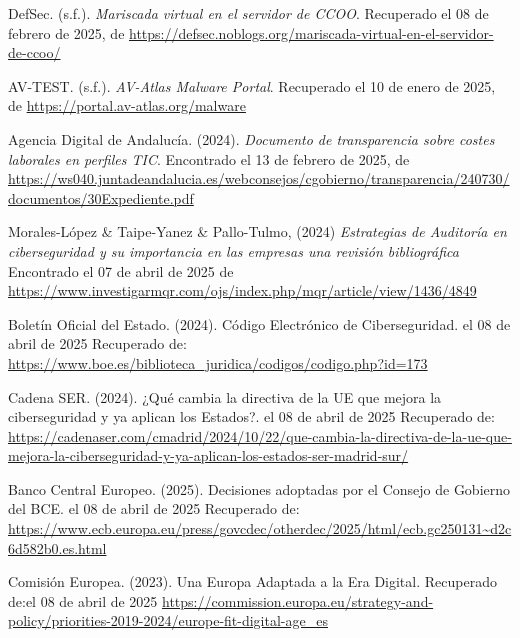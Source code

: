 \documentclass[a4paper, 10pt]{article}
\begin{document}
\begin{thebibliography}{20}
    
    DefSec. (s.f.). \textit{Mariscada virtual en el servidor de CCOO}. Recuperado el 08 de febrero de 2025, de \url{https://defsec.noblogs.org/mariscada-virtual-en-el-servidor-de-ccoo/}
    
    AV-TEST. (s.f.). \textit{AV-Atlas Malware Portal}. Recuperado el 10 de enero de 2025, de \url{https://portal.av-atlas.org/malware}
    
    Agencia Digital de Andalucía. (2024). \textit{Documento de transparencia sobre costes laborales en perfiles TIC}. Encontrado el 13 de febrero de 2025, de \url{https://ws040.juntadeandalucia.es/webconsejos/cgobierno/transparencia/240730/documentos/30Expediente.pdf}
    
    Morales-López \& Taipe-Yanez \& Pallo-Tulmo, (2024) \textit{Estrategias de Auditoría en ciberseguridad y su importancia en las empresas una revisión bibliográfica} Encontrado el 07 de abril de 2025 de \url{https://www.investigarmqr.com/ojs/index.php/mqr/article/view/1436/4849}

    Boletín Oficial del Estado. (2024). Código Electrónico de Ciberseguridad. el 08 de abril de 2025 Recuperado de: \url{https://www.boe.es/biblioteca_juridica/codigos/codigo.php?id=173}

   
    Cadena SER. (2024). ¿Qué cambia la directiva de la UE que mejora la ciberseguridad y ya aplican los Estados?. el 08 de abril de 2025 Recuperado de: \url{https://cadenaser.com/cmadrid/2024/10/22/que-cambia-la-directiva-de-la-ue-que-mejora-la-ciberseguridad-y-ya-aplican-los-estados-ser-madrid-sur/}

    Banco Central Europeo. (2025). Decisiones adoptadas por el Consejo de Gobierno del BCE. el 08 de abril de 2025 Recuperado de: \url{https://www.ecb.europa.eu/press/govcdec/otherdec/2025/html/ecb.gc250131~d2c6d582b0.es.html}

    Comisión Europea. (2023). Una Europa Adaptada a la Era Digital. Recuperado de:el 08 de abril de 2025  \url{https://commission.europa.eu/strategy-and-policy/priorities-2019-2024/europe-fit-digital-age_es}


\end{thebibliography}
\end{document}
